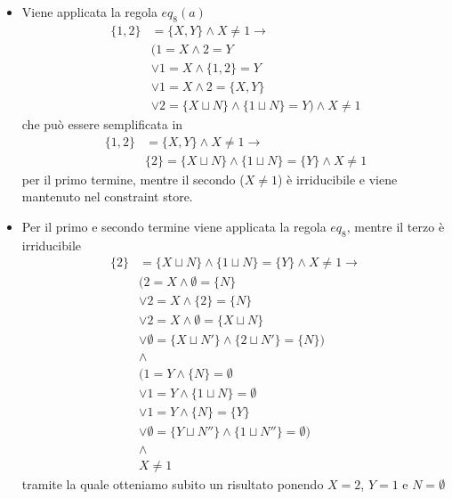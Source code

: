 \documentclass[12pt,a4paper,openright]{book} %
\begin{document}
\begin{itemize}
	\item Viene applicata la regola $eq_8(a)$\\ 
	  \[
	  \begin{split}
	    \{ 1, 2 \} &= \{ X, Y \} \land X \neq 1 \to \\
	      & (1 = X \land 2 = Y \\
	      & \lor 1 = X \land \{ 1,2 \} = Y \\
	      & \lor 1 = X \land 2 = \{ X,Y \} \\
	      & \lor 2 = \{ X \sqcup N \} \land \{ 1 \sqcup N \} = Y)  \land X \neq 1
	  \end{split}
	  \]
	  che può essere semplificata in 
	  \[
	    \begin{split}
	      \{ 1, 2 \} &= \{ X, Y \} \land X \neq 1 \to \\
	  	    & \{2\} = \{ X \sqcup N \} \land \{ 1 \sqcup N \} = \{Y\}  \land X \neq 1
        \end{split}
	  \]
	  per il primo termine, mentre il secondo ($X \neq 1$) è irriducibile e viene mantenuto nel constraint store.
	\item Per il primo e secondo termine viene applicata la regola $eq_8$, mentre il terzo è irriducibile
	  \[
	    \begin{split}
	      \{2\} &= \{ X \sqcup N \} \land \{ 1 \sqcup N \} = \{Y\}  \land X \neq 1 \to \\
	        & (2=X \land \emptyset=\{N\} \\
	        & \lor 2=X \land \{2\}=\{N\} \\
	        & \lor 2=X \land \emptyset = \{ X \sqcup N \} \\
	        & \lor \emptyset = \{X \sqcup N'\} \land \{ 2 \sqcup N'\} = \{ N\}) \\
	        & \land \\
	        & (1=Y \land \{N\} = \emptyset \\
	        & \lor 1=Y \land \{1 \sqcup N\} = \emptyset \\
	        & \lor 1=Y \land \{N\} = \{Y\} \\
	        & \lor \emptyset = \{Y \sqcup N'' \} \land \{1 \sqcup N''\} = \emptyset) \\
	        & \land \\ 
	        & X \neq 1
	    \end{split}
	  \]
	  tramite la quale otteniamo subito un risultato ponendo $X=2$, $Y=1$ e $N=\emptyset$
\end{itemize}
\end{document}
